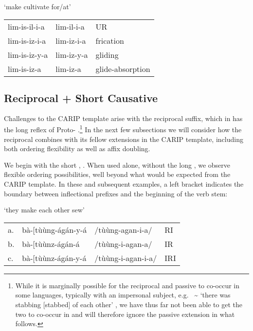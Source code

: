 \documentclass[output=paper,
modfonts
]{LSP/langsci}
\begin{document}
\ea `make cultivate for/at'\\
\begin{tabular}[t]{@{}lll@{}}
	lim-is-il-i-a & lim-il-i-a & UR \\
	lim-is-iz-i-a & lim-iz-i-a & frication \\
	lim-is-iz-y-a & lim-iz-y-a & gliding \\
	lim-is-iz-a & lim-iz-a & glide-absorption \\
\end{tabular}%
\z

\subsection{Reciprocal + Short Causative}

Challenges to the CARIP template arise with the reciprocal suffix, which
in  has the long reflex  of Proto-
.\footnote{While it is marginally possible for the
  reciprocal and passive to co-occur in some  languages, typically
  with an impersonal subject, e.g.\  
  \textasciitilde{}  `there was stabbing
  [stabbed] of each other' \citep[66]{sibanda2004}, we have thus far not
  been able to get the two to co-occur in  and will therefore ignore
  the passive extension in what follows.} In the next few subsections we
will consider how the reciprocal combines with its fellow extensions in
the CARIP template, including both ordering flexibility as well as affix
doubling.

We begin with the short , . When used alone, without
the long , we observe flexible ordering possibilities, well
beyond what would be expected from the CARIP template. In these and
subsequent examples, a left bracket indicates the boundary between
inflectional prefixes and the beginning of the verb stem:

\ea \label{ex:hyman:9} `they make each other sew'\\
\begin{tabular}[t]{@{}llll@{}}
a. & bà-{[}tùùng-ágán-y-á & /tùùng-agan-i-a/ & RI \\
b. & bà-{[}tùùnz-ágán-á & /tùùng-i-agan-a/  & IR \\
c. & bà-{[}tùùnz-ágán-y-á & /tùùng-i-agan-i-a/ & IRI \\
\end{tabular}
\z
\end{document}
